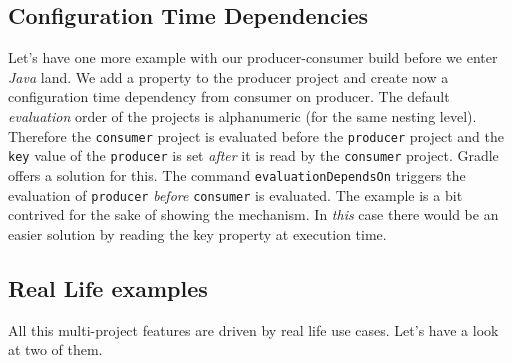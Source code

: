 \subsection{Configuration Time Dependencies} %
\label{sub:configuration_time_dependencies}
Let's have one more example with our producer-consumer build before we enter \emph{Java} land. We add a property to the producer project and create now a configuration time dependency from consumer on producer. 
The default \emph{evaluation} order of the projects is alphanumeric (for the same nesting level). Therefore the \texttt{consumer} project is evaluated before the \texttt{producer} project and the \texttt{key} value of the \texttt{producer} is set \emph{after} it is read by the \texttt{consumer} project. Gradle offers a solution for this. 
The command \texttt{evaluationDependsOn} triggers the evaluation of \texttt{producer} \emph{before} \texttt{consumer} is evaluated.
The example is a bit contrived for the sake of showing the mechanism. In \emph{this} case there would be an easier solution by reading the key property at execution time.

\subsection{Real Life examples} %
\label{sub:real_life_examples}
All this multi-project features are driven by real life use cases. Let's have a look at two of them. 










